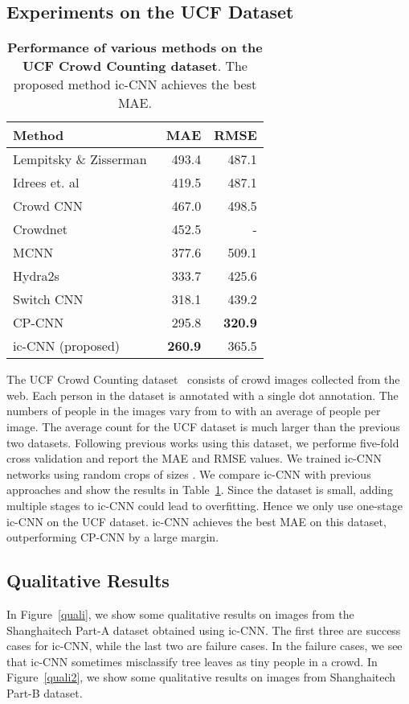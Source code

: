 \documentclass[runningheads]{llncs}
\begin{document}
\setlength{\tabcolsep}{25pt}
\subsection{Experiments on the UCF Dataset}
\begin{table}[!h]
\centering
\caption{{\bf Performance of various methods on the UCF Crowd Counting dataset}. The proposed method ic-CNN achieves the best MAE. \label{tab:tableucf}}
\begin{tabular}{lrr}
\toprule
Method     & MAE   & RMSE   \\
\midrule
Lempitsky \& Zisserman~\cite{lempitsky2010learning}  & 493.4 & 487.1 \\
Idrees et. al~\cite{idrees2013multi}     &  419.5     & 487.1      \\
Crowd CNN ~\cite{zhang2015cross}     &    467.0   & 498.5      \\
Crowdnet~\cite{boominathan2016crowdnet}   &     452.5  & -      \\
MCNN~\cite{zhang2016single}      &   377.6    &  509.1     \\
Hydra2s ~\cite{onoro2016towards}  &    333.7   &  425.6    \\
Switch CNN~\cite{sam2017switching} &     318.1  &  439.2     \\
CP-CNN~\cite{sindagi2017generating} &295.8 & \textbf{320.9} \\
ic-CNN (proposed) &\textbf{260.9} & 365.5 \\
\bottomrule
\end{tabular}
\vskip 0.1in
\end{table}

The UCF Crowd Counting dataset~\cite{idrees2013multi} consists of  crowd images collected from the web. Each person in the dataset is annotated with a single dot annotation. The numbers of people in the images vary from  to  with an average of  people per image. The average count for the UCF dataset is much larger than the previous two datasets. Following previous works using this dataset,  we performe five-fold cross validation and report the MAE and RMSE values. We trained ic-CNN networks using random crops of sizes . We compare ic-CNN with previous approaches and show the results in Table~\ref{tab:tableucf}. Since the dataset is small, adding multiple stages to ic-CNN could lead to overfitting. Hence we only use one-stage ic-CNN on the UCF dataset. ic-CNN achieves the best MAE on this dataset, outperforming CP-CNN by a large margin.

\subsection{Qualitative Results}
In Figure~\ref{quali}, we show some qualitative results on images from the Shanghaitech Part-A dataset obtained using ic-CNN. The first three are success cases for ic-CNN, while the last two are failure cases. In the failure cases, we see that ic-CNN sometimes misclassify tree leaves as tiny people in a crowd. In Figure~\ref{quali2}, we show some qualitative results on images from Shanghaitech Part-B dataset.
\end{document}
